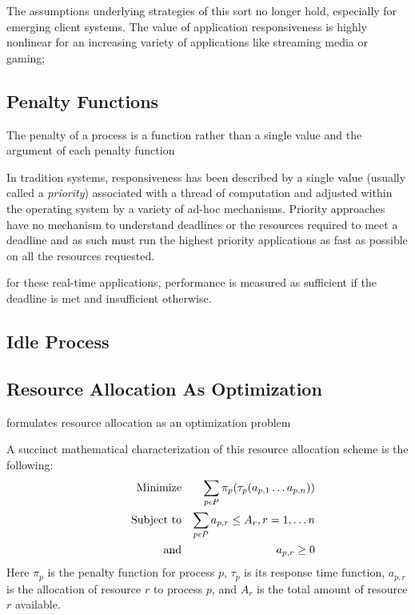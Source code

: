 The assumptions underlying strategies of this sort no longer hold, especially for emerging client systems.  The value of application responsiveness is highly nonlinear for an increasing variety of applications like streaming media or gaming;    

\subsection*{Penalty Functions}


The penalty of a process is a function rather than a single value
    and the argument of each penalty function
    
    
In tradition systems, responsiveness has been described by a single value (usually called a \emph{priority}) associated with a thread of computation and adjusted within the operating system by a variety of ad-hoc mechanisms.   Priority approaches have no mechanism to understand deadlines or the resources required to meet a deadline and as such must run the highest priority applications as fast as possible on all the resources requested. 

for these real-time applications, performance is measured as sufficient if the deadline is met and insufficient otherwise.
    
    
\subsection*{Idle Process}    

\subsection*{Resource Allocation As Optimization}
\pacora formulates resource allocation as an optimization problem 


A succinct mathematical characterization of this resource allocation scheme is the following:
\begin{eqnarray*}
& \makebox[1in][r]{Minimize}   & \sum_{p\epsilon P} {\pi_p(\tau_p(a_{p,1}\ldots a_{p,n}))}  \\
& \makebox[1in][r]{Subject to} & \sum_{p\epsilon P} a_{p,r} \leq A_r, r = 1,\ldots n        \\
& \makebox[1in][r]{and}        & a_{p,r} \geq 0
\end{eqnarray*}
Here $\pi_p$ is the penalty function for process $p$,
$\tau_p$ is its response time function,
$a_{p,r}$ is the allocation of resource $r$ to process $p$,
and $A_r$ is the total amount of resource $r$ available.


